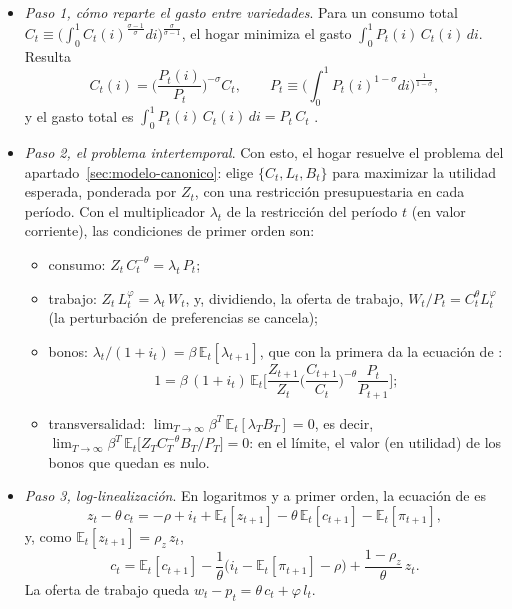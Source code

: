 \documentclass[11pt]{article}
\begin{document}
\begin{itemize}
\item \emph{Paso 1, cómo reparte el gasto entre variedades}. Para un consumo total $C_t\equiv\big(\int_0^1C_t(i)^{\frac{\sigma-1}{\sigma}}di\big)^{\frac{\sigma}{\sigma-1}}$, el hogar minimiza el gasto $\int_0^1P_t(i)\,C_t(i)\,di$. Resulta
  $$C_t(i)=\Big(\frac{P_t(i)}{P_t}\Big)^{-\sigma}C_t,\qquad P_t\equiv\Big(\int_0^1P_t(i)^{1-\sigma}di\Big)^{\frac{1}{1-\sigma}},$$
  y el gasto total es $\int_0^1P_t(i)\,C_t(i)\,di=P_t\,C_t$ .
\item \emph{Paso 2, el problema intertemporal}. Con esto, el hogar resuelve el problema del apartado~\ref{sec:modelo-canonico}: elige $\{C_t,L_t,B_t\}$ para maximizar la utilidad esperada, ponderada por $Z_t$, con una restricción presupuestaria en cada período. Con el multiplicador $\lambda_t$ de la restricción del período $t$ (en valor corriente), las condiciones de primer orden son:
  \begin{itemize}
  \item consumo: $Z_t\,C_t^{-\theta}=\lambda_t\,P_t$;
  \item trabajo: $Z_t\,L_t^{\varphi}=\lambda_t\,W_t$, y, dividiendo, la oferta de trabajo, $W_t/P_t=C_t^{\theta}L_t^{\varphi}$ (la perturbación de preferencias se cancela);
  \item bonos: $\lambda_t/(1+i_t)=\beta\,\mathbb{E}_t[\lambda_{t+1}]$, que con la primera da la ecuación de :
    $$1=\beta\,(1+i_t)\,\mathbb{E}_t\Big[\frac{Z_{t+1}}{Z_t}\Big(\frac{C_{t+1}}{C_t}\Big)^{-\theta}\frac{P_t}{P_{t+1}}\Big];$$
  \item transversalidad: $\lim_{T\to\infty}\beta^T\,\mathbb{E}_t[\lambda_TB_T]=0$, es decir, $\lim_{T\to\infty}\beta^T\,\mathbb{E}_t\big[Z_TC_T^{-\theta}B_T/P_T\big]=0$: en el límite, el valor (en utilidad) de los bonos que quedan es nulo.
  \end{itemize}
\item \emph{Paso 3, log-linealización}. En logaritmos y a primer orden, la ecuación de  es
  $$z_t-\theta\,c_t=-\rho+i_t+\mathbb{E}_t[z_{t+1}]-\theta\,\mathbb{E}_t[c_{t+1}]-\mathbb{E}_t[\pi_{t+1}],$$
  y, como $\mathbb{E}_t[z_{t+1}]=\rho_z\,z_t$,
  \begin{equation}
  c_t=\mathbb{E}_t[c_{t+1}]-\frac{1}{\theta}\big(i_t-\mathbb{E}_t[\pi_{t+1}]-\rho\big)+\frac{1-\rho_z}{\theta}\,z_t. \label{eq:anexo-euler}
  \end{equation}
  La oferta de trabajo queda $w_t-p_t=\theta\,c_t+\varphi\,l_t$.
\end{itemize}
\end{document}
